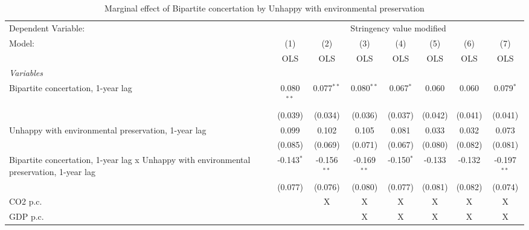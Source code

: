 
\begin{table}[htbp]
   \caption{Marginal effect of Bipartite concertation by Unhappy with environmental preservation}
   \centering
   \begin{tabular}{lccccccc}
      \toprule
      Dependent Variable: & \multicolumn{7}{c}{Stringency value modified}\\
      Model:                                                                                   & (1)          & (2)           & (3)           & (4)          & (5)     & (6)     & (7)\\  
                                                                                               &  OLS         & OLS           & OLS           & OLS          & OLS     & OLS     & OLS\\  
      \midrule
      \emph{Variables}\\
      Bipartite concertation, 1-year lag                                                       & 0.080$^{**}$ & 0.077$^{**}$  & 0.080$^{**}$  & 0.067$^{*}$  & 0.060   & 0.060   & 0.079$^{*}$\\   
                                                                                               & (0.039)      & (0.034)       & (0.036)       & (0.037)      & (0.042) & (0.041) & (0.041)\\   
      Unhappy with environmental preservation, 1-year lag                                      & 0.099        & 0.102         & 0.105         & 0.081        & 0.033   & 0.032   & 0.073\\   
                                                                                               & (0.085)      & (0.069)       & (0.071)       & (0.067)      & (0.080) & (0.082) & (0.081)\\   
      Bipartite concertation, 1-year lag x Unhappy with environmental preservation, 1-year lag & -0.143$^{*}$ & -0.156$^{**}$ & -0.169$^{**}$ & -0.150$^{*}$ & -0.133  & -0.132  & -0.197$^{**}$\\   
                                                                                               & (0.077)      & (0.076)       & (0.080)       & (0.077)      & (0.081) & (0.082) & (0.074)\\   
      CO2 p.c.                                                                                 &              & X             & X             & X            & X       & X       & X\\  
      GDP p.c.                                                                                 &              &               & X             & X            & X       & X       & X\\  

\end{tabular}
\end{table}

